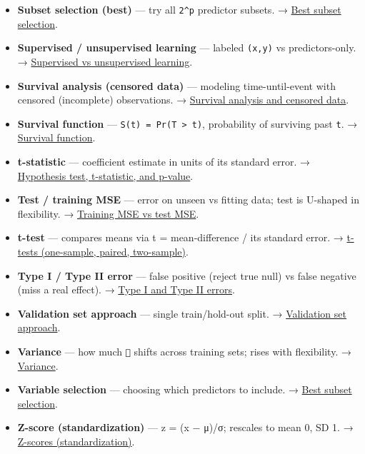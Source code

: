 \documentclass[
  10pt,
  letterpaper,
  onecolumn]{article}
\begin{document}
\begin{itemize}
  \protect\hyperlink{forward-and-backward-stepwise-selection}{Forward
  and backward stepwise selection}.
\item
  \textbf{Subset selection (best)} --- try all \texttt{2\^{}p} predictor
  subsets. → \protect\hyperlink{best-subset-selection}{Best subset
  selection}.
\item
  \textbf{Supervised / unsupervised learning} --- labeled \texttt{(x,y)}
  vs predictors-only. →
  \protect\hyperlink{supervised-vs-unsupervised-learning}{Supervised vs
  unsupervised learning}.
\item
  \textbf{Survival analysis (censored data)} --- modeling
  time-until-event with censored (incomplete) observations. →
  \protect\hyperlink{survival-analysis-and-censored-data}{Survival
  analysis and censored data}.
\item
  \textbf{Survival function} ---
  \texttt{S(t)\ =\ Pr(T\ \textgreater{}\ t)}, probability of surviving
  past \texttt{t}. → \protect\hyperlink{survival-function}{Survival
  function}.
\item
  \textbf{t-statistic} --- coefficient estimate in units of its standard
  error. →
  \protect\hyperlink{hypothesis-test-t-statistic-and-p-value}{Hypothesis
  test, t-statistic, and p-value}.
\item
  \textbf{Test / training MSE} --- error on unseen vs fitting data; test
  is U-shaped in flexibility. →
  \protect\hyperlink{training-mse-vs-test-mse}{Training MSE vs test
  MSE}.
\item
  \textbf{t-test} --- compares means via t = mean-difference / its
  standard error. →
  \protect\hyperlink{t-tests-one-sample-paired-two-sample}{t-tests
  (one-sample, paired, two-sample)}.
\item
  \textbf{Type I / Type II error} --- false positive (reject true null)
  vs false negative (miss a real effect). →
  \protect\hyperlink{type-i-and-type-ii-errors}{Type I and Type II
  errors}.
\item
  \textbf{Validation set approach} --- single train/hold-out split. →
  \protect\hyperlink{validation-set-approach}{Validation set approach}.
\item
  \textbf{Variance} --- how much \texttt{} shifts across training sets;
  rises with flexibility. → \protect\hyperlink{variance}{Variance}.
\item
  \textbf{Variable selection} --- choosing which predictors to include.
  → \protect\hyperlink{best-subset-selection}{Best subset selection}.
\item
  \textbf{Z-score (standardization)} --- z = (x − μ)/σ; rescales to mean
  0, SD 1. → \protect\hyperlink{z-scores-standardization}{Z-scores
  (standardization)}.
\end{itemize}
\end{document}
